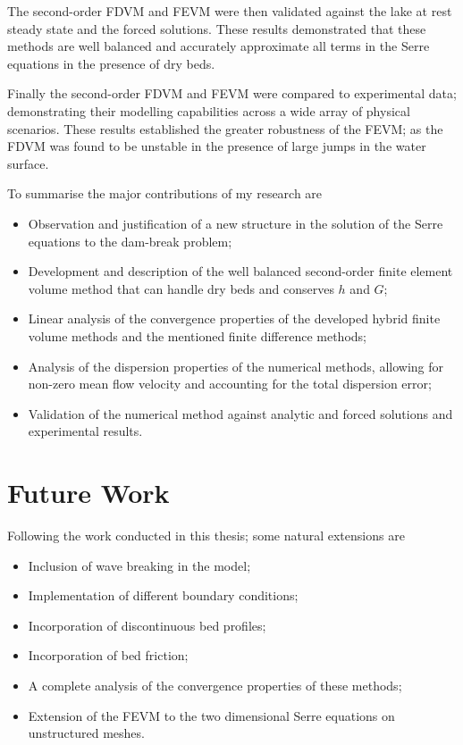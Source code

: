 The second-order FDVM and FEVM were then validated against the lake at rest steady state and the forced solutions. These results demonstrated that these methods are well balanced and accurately approximate all terms in the Serre equations in the presence of dry beds. 

Finally the second-order FDVM and FEVM  were compared to experimental data; demonstrating their modelling capabilities across a wide array of physical scenarios. These results established the greater robustness of the FEVM; as the FDVM was found to be unstable in the presence of large jumps in the water surface. 

To summarise the major contributions of my research are
\begin{itemize}
	\item Observation and justification of a new structure in the solution of the Serre equations to the dam-break problem;
	\item Development and description of the well balanced second-order finite element volume method that can handle dry beds and conserves $h$ and $G$;
	\item Linear analysis of the convergence properties of the developed hybrid finite volume methods and the mentioned finite difference methods;
	\item Analysis of the dispersion properties of the numerical methods, allowing for non-zero mean flow velocity and accounting for the total dispersion error;
	\item Validation of the numerical method against analytic and forced solutions and experimental results. 
\end{itemize}

\section{Future Work}
Following the work conducted in this thesis; some natural extensions are
\begin{itemize}
	\item Inclusion of wave breaking in the model; 
	\item Implementation of different boundary conditions;
	\item Incorporation of discontinuous bed profiles;
	\item Incorporation of bed friction;
	\item A complete analysis of the convergence properties of these methods;
	\item Extension of the FEVM to the two dimensional Serre equations on unstructured meshes.
\end{itemize}




